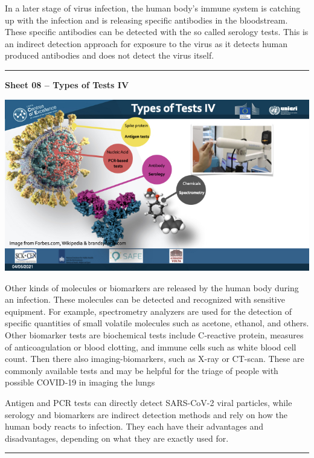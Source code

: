 \documentclass[
]{book}
\newcommand{\RL}[1]{\beginR #1\endR}
\begin{document}
In a later stage of virus infection, the human body\RL{'}s
immune system is catching up with the infection and is releasing
specific antibodies in the bloodstream. These specific antibodies can be
detected with the so called serology tests. This is an indirect
detection approach for exposure to the virus as it detects human
produced antibodies and does not detect the virus itself.

\begin{center}\rule{0.5\linewidth}{0.5pt}\end{center}

\textbf{Sheet 08 -- Types of Tests IV}

\includegraphics{images/m02/m02_types_of_rapid_tests_final.008.jpeg}

Other kinds of molecules or biomarkers are released by the human body
during an infection. These molecules can be detected and recognized with
sensitive equipment. For example, spectrometry analyzers are used for
the detection of specific quantities of small volatile molecules such as
acetone, ethanol, and others. Other biomarker tests are biochemical
tests include C‐reactive protein, measures of anticoagulation or blood
clotting, and immune cells such as white blood cell count. Then there
also imaging-biomarkers, such as X-ray or CT-scan. These are commonly
available tests and may be helpful for the triage of people with
possible COVID‐19 in imaging the lungs

Antigen and PCR tests can directly detect SARS-CoV-2 viral particles,
while serology and biomarkers are indirect detection methods and rely on
how the human body reacts to infection. They each have their advantages
and disadvantages, depending on what they are exactly used for.

\begin{center}\rule{0.5\linewidth}{0.5pt}\end{center}
\end{document}
